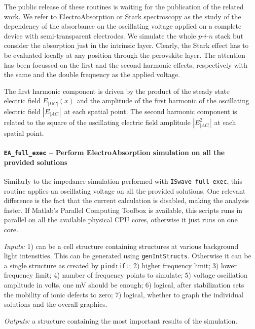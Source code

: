 The public release of these routines is waiting for the publication of the related work.
We refer to ElectroAbsorption or Stark spectroscopy as the study of the dependency of the absorbance on the oscillating voltage applied on a complete device with semi\hyp{}transparent electrodes.
We simulate the whole $p$-$i$-$n$ stack but consider the absorption just in the intrinsic layer.
Clearly, the Stark effect has to be evaluated locally at any position through the perovskite layer.
The attention has been focussed on the first and the second harmonic effects, respectively with the same and the double frequency as the applied voltage.

The first harmonic component is driven by the product of the steady state electric field $E_|DC|(x)$ and the amplitude of the first harmonic of the oscillating electric field $|E_|AC||$ at each spatial point.
The second harmonic component is related to the square of the oscillating electric field amplitude $|E_|AC|^2|$ at each spatial point.



\paragraph{\texttt{EA\_full\_exec} -- Perform ElectroAbsorption simulation on all the provided solutions}
Similarly to the impedance simulation performed with \texttt{ISwave\_full\_exec}, this routine applies an oscillating voltage on all the provided solutions.
One relevant difference is the fact that the current calculation is disabled, making the analysis faster.
If Matlab's Parallel Computing Toolbox is available, this scripts runs in parallel on all the available physical CPU cores, otherwise it just runs on one core.

\textit{Inputs:} 1) can be a cell structure containing structures at various background
light intensities. This can be generated using \texttt{gen\-Int\-Structs}.
Otherwise it can be a single structure as created by \texttt{pindrift};
2) higher frequency limit;
3) lower frequency limit;
4) number of frequency points to simulate;
5) voltage oscillation amplitude in volts, one mV should be enough;
6) logical, after stabilization sets the mobility of
ionic defects to zero;
7) logical, whether to graph the individual solutions and
the overall graphics.

\textit{Outputs:} a structure containing the most important results of the simulation.

